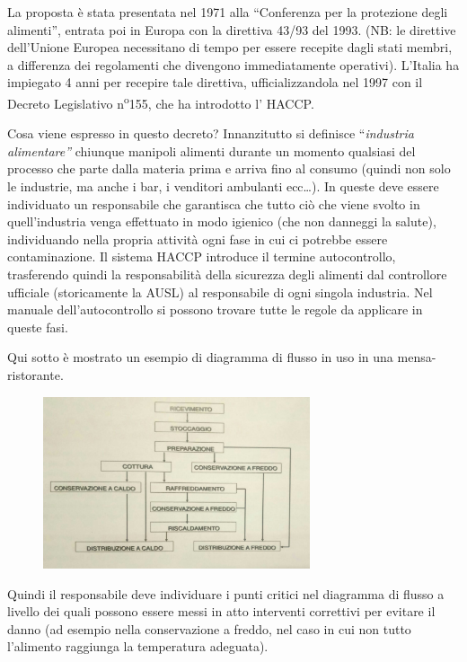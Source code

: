 La proposta è stata presentata nel 1971 alla ``Conferenza per la
protezione degli alimenti'', entrata poi in Europa con la direttiva
43/93 del 1993. (NB: le direttive dell'Unione Europea necessitano di
tempo per essere recepite dagli stati membri, a differenza dei
regolamenti che divengono immediatamente operativi). L'Italia ha
impiegato 4 anni per recepire tale direttiva, ufficializzandola nel 1997
con il Decreto Legislativo n\textsuperscript{o}155, che ha introdotto l' HACCP.

Cosa viene espresso in questo decreto? Innanzitutto si definisce
``\emph{industria alimentare''} chiunque manipoli alimenti durante un
momento qualsiasi del processo che parte dalla materia prima e arriva
fino al consumo (quindi non solo le industrie, ma anche i bar, i
venditori ambulanti ecc\ldots{}). In queste deve essere individuato un
responsabile che garantisca che tutto ciò che viene svolto in
quell'industria venga effettuato in modo igienico (che non danneggi la
salute), individuando nella propria attività ogni fase in cui ci
potrebbe essere contaminazione. Il sistema HACCP introduce il termine
autocontrollo, trasferendo quindi la responsabilità della sicurezza
degli alimenti dal controllore ufficiale (storicamente la AUSL) al
responsabile di ogni singola industria. Nel manuale dell'autocontrollo
si possono trovare tutte le regole da applicare in queste fasi.

Qui sotto è mostrato un esempio di diagramma di flusso in uso in una
mensa-ristorante.

\begin{figure}[!ht]
\centering
	\includegraphics[width=0.7\textwidth]{20/image2.jpeg}
	\end{figure}

Quindi il responsabile deve individuare i punti critici nel diagramma di
flusso a livello dei quali possono essere messi in atto interventi
correttivi per evitare il danno (ad esempio nella conservazione a
freddo, nel caso in cui non tutto l'alimento raggiunga la temperatura
adeguata).

